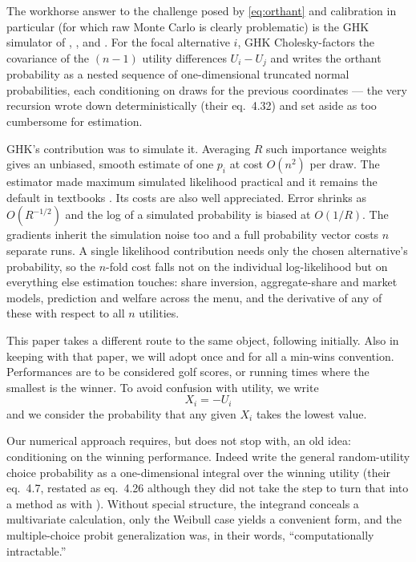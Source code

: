 \documentclass[11pt]{article}
\begin{document}
The workhorse answer to the challenge posed by \eqref{eq:orthant} and calibration in particular (for which raw Monte Carlo is clearly problematic) is the GHK simulator of \citet{geweke1989},
\citet{borschsupan1993}, \citet{keane1994} and \citet{hajivassiliou1996}. For
the focal alternative $i$, GHK Cholesky-factors the covariance of the
$(n-1)$ utility differences $U_i-U_j$ and writes the orthant probability
as a nested sequence of one-dimensional truncated normal probabilities,
each conditioning on draws for the previous coordinates --- the very
recursion \citet{domencich1975} wrote down deterministically (their
eq.~4.32) and set aside as too cumbersome for estimation.

GHK's contribution was to simulate it. Averaging $R$ such importance weights gives an
unbiased, smooth estimate of one $p_i$ at cost $O(n^2)$ per draw. The estimator
made maximum simulated likelihood practical and it remains the default in
textbooks \citep{train2009}. Its costs are also well appreciated. Error shrinks as
$O(R^{-1/2})$ and the log of a simulated probability is biased at $O(1/R)$. The
gradients inherit the simulation noise too and a full probability vector costs
$n$ separate runs. A single likelihood contribution needs only the chosen
alternative's probability, so the $n$-fold cost falls not on the individual
log-likelihood but on everything else estimation touches: share inversion,
aggregate-share and market models, prediction and welfare across the menu,
and the derivative of any of these with respect to all $n$ utilities.

This paper takes a different route to the same object, following \citet{cotton2021} initially. Also in keeping with that paper, we will adopt once and for all a min-wins
convention. Performances are to be considered golf scores, or running times where the smallest is the winner. To avoid confusion with utility, we write
$$X_i=-U_i$$
and we consider the probability that any given $X_i$ takes the lowest value.

Our numerical approach requires, but does not stop with, an old idea: conditioning on the winning performance. Indeed \citet{domencich1975} write the general random-utility choice probability as a one-dimensional integral over the winning utility
(their eq.~4.7, restated as eq.~4.26 although they did not take the step to turn that into a method as with \citet{cotton2021}). Without special structure, the integrand conceals a multivariate calculation, only the Weibull case yields a convenient form, and the multiple-choice probit generalization
was, in their words, ``computationally intractable.''
\end{document}
